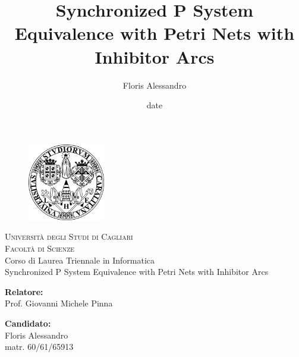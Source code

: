 \title{Synchronized P System Equivalence with Petri Nets with Inhibitor Arcs}
\author{Floris Alessandro}
\date{date}

\begin{titlepage}
\begin{figure}[t]
    \centering\includegraphics[width=0.3\textwidth]{images/logo.png}
\end{figure}
\begin{center}
    \textsc{ \LARGE{Università degli Studi di Cagliari \\}}
	\textsc{ \LARGE{Facoltà di Scienze\\ }}
	\textnormal{ \LARGE{Corso di Laurea Triennale in Informatica\\}}
	\vspace{30mm}
	\fontsize{10mm}{7mm}\selectfont 
    \textup{Synchronized P System Equivalence with Petri Nets with Inhibitor Arcs}\\
\end{center}

\vspace{25mm}

\begin{minipage}[t]{0.47\textwidth}
	\textnormal{\large{\bf Relatore:\\}}
	{\large Prof. Giovanni Michele Pinna}
\end{minipage}\hfill\begin{minipage}[t]{0.47\textwidth}\raggedleft
	\textnormal{\large{\bf Candidato:\\}}
	{\large Floris Alessandro\\ matr. 60/61/65913}
\end{minipage}

\vspace{20mm}


\end{titlepage}
